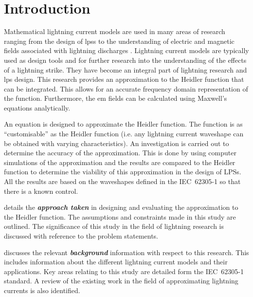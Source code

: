 
\chapter{Introduction} %

\label{ChapterIntro} %


Mathematical lightning current models are used in many areas of research ranging from the design of \glspl{lps} to the understanding of electric and magnetic fields associated with lightning discharges \cite{IEC623051, ZhangFeizhouandLiuShanghe2002}.
Lightning current models are typically used as design tools and for further research into the understanding of the effects of a lightning strike.
They have become an integral part of lightning research and \gls{lps} design.
This research provides an approximation to the Heidler function that can be integrated. This allows for an accurate frequency domain representation of the function. Furthermore, the \gls{em} fields can be calculated using Maxwell's equations analytically.

An equation is designed to approximate the Heidler function. The function is as ``customisable'' as the Heidler function (i.e. any lightning current waveshape can be obtained with varying characteristics).
An investigation is carried out to determine the accuracy of the approximation. This is done by using computer simulations of the approximation and the results are compared to the Heidler function to determine the viability of this approximation in the design of LPSs. All the results are based on the waveshapes defined in the IEC~62305-1 so that there is a known control.

 details the \textbf{\textit{approach taken}} in designing and evaluating the approximation to the Heidler function. The assumptions and constraints made in this study are outlined. The significance of this study in the field of lightning research is discussed with reference to the problem statements.

 discusses the relevant \textbf{\textit{background}} information with respect to this research. This includes information about the different lightning current models and their applications. Key areas relating to this study are detailed form the IEC~62305-1 standard. A review of the existing work in the field of approximating lightning currents is also identified.

